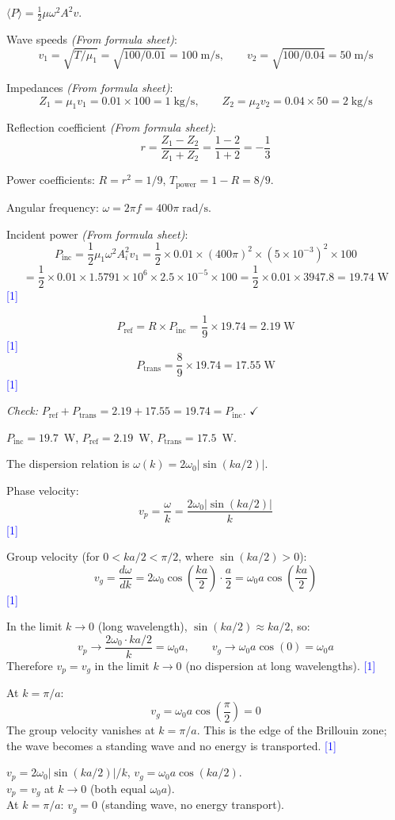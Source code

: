 \documentclass[12pt,a4paper]{article}
\newcommand{\markstep}[1]{\hfill\textcolor{blue}{[#1]}}
\newcommand{\finalanswer}[1]{%
  \begin{tcolorbox}[colback=green!5!white,colframe=green!50!black,boxrule=0.5pt]
  #1
  \end{tcolorbox}
}
\newcommand{\fromsheet}{\textit{(From formula sheet)}}
\begin{document}
\begin{parts}
\finalanswer{$\langle P\rangle = \tfrac{1}{2}\mu\omega^2 A^2 v$.}

\item Wave speeds \fromsheet:
\[
v_1 = \sqrt{T/\mu_1} = \sqrt{100/0.01} = 100\;\text{m/s}, \qquad v_2 = \sqrt{100/0.04} = 50\;\text{m/s}
\]

Impedances \fromsheet:
\[
Z_1 = \mu_1 v_1 = 0.01\times 100 = 1\;\text{kg/s}, \qquad Z_2 = \mu_2 v_2 = 0.04\times 50 = 2\;\text{kg/s}
\]

Reflection coefficient \fromsheet:
\[
r = \frac{Z_1 - Z_2}{Z_1 + Z_2} = \frac{1 - 2}{1 + 2} = -\frac{1}{3}
\]

Power coefficients: $R = r^2 = 1/9$, \quad $T_{\text{power}} = 1 - R = 8/9$.

Angular frequency: $\omega = 2\pi f = 400\pi\;\text{rad/s}$.

Incident power \fromsheet:
\[
P_{\text{inc}} = \frac{1}{2}\mu_1\omega^2 A_i^2 v_1 = \frac{1}{2}\times 0.01\times(400\pi)^2\times(5\times 10^{-3})^2\times 100
\]
\[
= \frac{1}{2}\times 0.01\times 1.5791\times 10^6\times 2.5\times 10^{-5}\times 100 = \frac{1}{2}\times 0.01\times 3947.8 = 19.74\;\text{W}
\]
\markstep{1}

\[
P_{\text{ref}} = R\times P_{\text{inc}} = \frac{1}{9}\times 19.74 = 2.19\;\text{W}
\]
\markstep{1}
\[
P_{\text{trans}} = \frac{8}{9}\times 19.74 = 17.55\;\text{W}
\]
\markstep{1}

\textit{Check:} $P_{\text{ref}} + P_{\text{trans}} = 2.19 + 17.55 = 19.74 = P_{\text{inc}}$. $\checkmark$

\finalanswer{$P_{\text{inc}} = 19.7$~W, \quad $P_{\text{ref}} = 2.19$~W, \quad $P_{\text{trans}} = 17.5$~W.}

\item The dispersion relation is $\omega(k) = 2\omega_0\left|\sin(ka/2)\right|$.

Phase velocity:
\[
v_p = \frac{\omega}{k} = \frac{2\omega_0|\sin(ka/2)|}{k}
\]
\markstep{1}

Group velocity (for $0 < ka/2 < \pi/2$, where $\sin(ka/2) > 0$):
\[
v_g = \frac{d\omega}{dk} = 2\omega_0\cos\!\left(\frac{ka}{2}\right)\cdot\frac{a}{2} = \omega_0 a\cos\!\left(\frac{ka}{2}\right)
\]
\markstep{1}

In the limit $k\to 0$ (long wavelength), $\sin(ka/2) \approx ka/2$, so:
\[
v_p \to \frac{2\omega_0\cdot ka/2}{k} = \omega_0 a, \qquad v_g \to \omega_0 a\cos(0) = \omega_0 a
\]
Therefore $v_p = v_g$ in the limit $k\to 0$ (no dispersion at long wavelengths). \markstep{1}

At $k = \pi/a$:
\[
v_g = \omega_0 a\cos\!\left(\frac{\pi}{2}\right) = 0
\]
The group velocity vanishes at $k = \pi/a$. This is the edge of the Brillouin zone; the wave becomes a standing wave and no energy is transported. \markstep{1}

\finalanswer{$v_p = 2\omega_0|\sin(ka/2)|/k$, \quad $v_g = \omega_0 a\cos(ka/2)$.\\
$v_p = v_g$ at $k\to 0$ (both equal $\omega_0 a$).\\
At $k = \pi/a$: $v_g = 0$ (standing wave, no energy transport).}
\end{parts}
\end{document}
